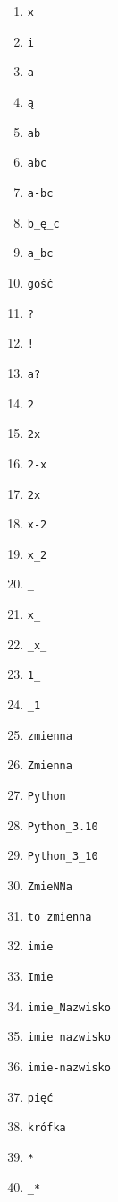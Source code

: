 \documentclass[a4paper]{article}
\begin{document}
\begin{multicols}{3}
\begin{enumerate}[label=\arabic*.]
    \item \verb|x|
    \item \verb|i|
    \item \verb|a|
    \item \verb|ą|
    \item \verb|ab|
    \item \verb|abc|
    \item \verb|a-bc|
    \item \verb|b_ę_c|
    \item \verb|a_bc|
    \item \verb|gość|
    \item \verb|?|
    \item \verb|!|
    \item \verb|a?|
    \item \verb|2|
    \item \verb|2x|
    \item \verb|2-x|
    \item \verb|2x|
    \item \verb|x-2|
    \item \verb|x_2|
    \item \verb|_|
    \item \verb|x_|
    \item \verb|_x_|
    \item \verb|1_|
    \item \verb|_1|
    \item \verb|zmienna|
    \item \verb|Zmienna|
    \item \verb|Python|
    \item \verb|Python_3.10|
    \item \verb|Python_3_10|
    \item \verb|ZmieNNa|
    \item \verb|to zmienna|
    \item \verb|imie|
    \item \verb|Imie|
    \item \verb|imie_Nazwisko|
    \item \verb|imie nazwisko|
    \item \verb|imie-nazwisko|
    \item \verb|pięć|
    \item \verb|krófka|
    \item \verb|*|
    \item \verb|_*|
\end{enumerate}
\end{multicols}
\end{document}
